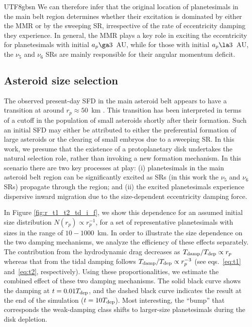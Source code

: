 \documentclass[tighten]{aastex6}
\begin{document}
\begin{CJK*}{UTF8}{gbsn}
We can therefore infer that the original location of planetesimals in the main belt region determines whether their excitation is dominated by either the MMR or by the 
sweeping SR, irrespective of the rate of eccentricity damping they experience. In general, the MMR plays a key role in exciting the eccentricity for planetesimals with initial $a_p \ga 3$~AU, 
while for those with initial $a_p \la 3$~AU, the $\nu_5$ and $\nu_6$ SRs are mainly responsible for their angular momentum deficit.








\subsection{Asteroid size selection}

The observed present-day SFD in the main asteroid belt appears to have 
a transition at around $r_p \approx 50$~km \citep[e.g.,][]{bottke2005, 
morbidelli2009}.  This transition has been interpreted in terms of a  
cutoff in the population of small asteroids shortly after their formation.
Such an initial SFD may either be attributed to either the preferential formation
of large asteroids or the clearing of small embryos due to a sweeping 
SR. In this work, we presume that the existence of a 
protoplanetary disk undertakes the natural selection role, rather than 
invoking a new formation mechanism. In this scenario there are two key 
processes at play: (i) planetesimals in the main asteroid belt region 
can be significantly excited as SRs (in this work the $\nu_5$ 
and $\nu_6$ SRs) propagate through the region; and (ii) the excited 
planetesimals experience dispersive inward migration due to the size-dependent 
eccentricity damping force.

In Figure \ref{fig:r_t1_t2_td_i_f}, we show this dependence for an assumed 
initial size distribution $N(r_p) \propto r_p^{-1}$, for a set of 
representative planetesimals with sizes in the range of $10-1000$~km. 
In order to illustrate the size dependence on the two damping mechanisms, 
we analyze the efficiency of these effects separately. The contribution 
from the hydrodynamic drag decreases  as $T_{\rm damp}/T_{\rm dep} 
\propto r_p$ whereas that from the tidal damping follows 
$T_{\rm damp}/T_{\rm dep} \propto r_p^{-3}$ (see eqs.~\ref{eq:t1} 
and~\ref{eq:t2}, respectively). Using these proportionalities, 
we estimate the combined effect of these two damping mechanisms.
The solid black curve shows the damping at $t=0.01T_{\rm dep}$, and 
the dashed black curve indicates the result at the end of the simulation 
($t=10T_{\rm dep}$). Most interesting, the ``bump'' that 
corresponds the weak-damping class shifts to larger-size planetesimals
during the disk depletion.   


\end{CJK*}
\end{document}

